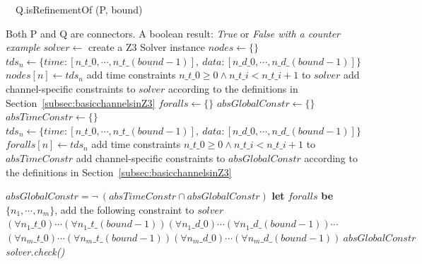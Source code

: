 \documentclass[preprint,3p]{elsarticle}
\begin{document}
\begin{algorithm}[H]
    \caption{\ \ Q.isRefinementOf (P, bound)}\label{alg:refineZ3}
    \begin{algorithmic}[1]
        \REQUIRE Both P and Q are connectors.
        \ENSURE A boolean result: \emph{True} or \emph{False with a counter example}
        \STATE $solver\leftarrow$ create a Z3 Solver instance
        \STATE $nodes\leftarrow \{\}$
					\STATE $tds_n\leftarrow\{ 					time :[n\_t\_0, \cdots,n\_t\_(bound-1)],\  data:[n\_d\_0, \cdots,n\_d\_(bound-1)]\}$
            \STATE $nodes[n]\leftarrow tds_n$
            \STATE add time constraints  $n\_t\_0 \geq 0  \land  n\_t\_i < n\_t\_i+1$ to $solver$
				\ENDIF
			\ENDFOR
		\STATE add channel-specific constraints to $solver$ according to the definitions in Section~\ref{subsec:basicchannelsinZ3}
        \ENDFOR
        \newline
        \STATE $foralls \leftarrow \{\}$     %
        \STATE $absGlobalConstr \leftarrow \{\}$ %
        \STATE $absTimeConstr \leftarrow \{\}$ %
					\STATE $tds_n\leftarrow\{ 					time :[n\_t\_0, \cdots,n\_t\_(bound-1)],\  data:[n\_d\_0, \cdots,n\_d\_(bound-1)]\}$
          \STATE $foralls[n]\leftarrow tds_n$
					\STATE add time constraints $n\_t\_0 \geq 0  \land  n\_t\_i < n\_t\_i+1$ to $absTimeConstr$
				\ENDIF
			\STATE add channel-specific constraints to $absGlobalConstr$ according to the definitions in Section~\ref{subsec:basicchannelsinZ3}
			\ENDFOR
		\ENDFOR
		\newline

		\STATE $absGlobalConstr = \neg \ (absTimeConstr \cap absGlobalConstr)  $
    \STATE \textbf{let} $foralls$ \textbf{be} $\{n_1,\cdots,n_m\}$, add the following constraint to $solver$
    \STATE
    \hspace{2em}$(\forall n_1\_t\_0)\cdots(\forall n_1\_t\_(bound-1))(\forall n_1\_d\_0)\cdots(\forall n_1\_d\_(bound-1))\cdots$
    \STATE \hspace{2em}$(\forall n_m\_t\_0)\cdots(\forall n_m\_t\_(bound-1))(\forall n_m\_d\_0)\cdots(\forall n_m\_d\_(bound-1))\:absGlobalConstr$
    \newline
    \STATE \emph{solver.check()}
    \end{algorithmic}
\end{algorithm}
\end{document}
